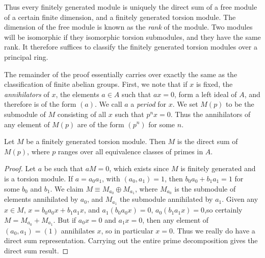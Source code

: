 Thus every finitely generated module is uniquely the direct sum of a free module of a certain finite dimension, and a finitely generated torsion module. The dimension of the free module is known as the \emph{rank} of the module. Two modules will be isomorphic if they isomorphic torsion submodules, and they have the same rank. It therefore suffices to classify the finitely generated torsion modules over a principal ring.

The remainder of the proof essentially carries over exactly the same as the classification of finite abelian groups. First, we note that if $x$ is fixed, the \emph{annihilators} of $x$, the elements $a \in A$ such that $ax = 0$, form a left ideal of $A$, and therefore is of the form $(a)$. We call $a$ a \emph{period} for $x$. We set $M(p)$ to be the submodule of $M$ consisting of all $x$ such that $p^n x = 0$. Thus the annihilators of any element of $M(p)$ are of the form $(p^n)$ for some $n$.

\begin{theorem}
    Let $M$ be a finitely generated torsion module. Then $M$ is the direct sum of $M(p)$, where $p$ ranges over all equivalence classes of primes in $A$.
\end{theorem}
\begin{proof}
    Let $a$ be such that $aM = 0$, which exists since $M$ is finitely generated and is a torsion module. If $a = a_0a_1$, with $(a_0,a_1) = 1$, then $b_0a_0 + b_1a_1 = 1$ for some $b_0$ and $b_1$. We claim $M \equiv M_{a_0} \oplus M_{a_1}$, where $M_{a_0}$ is the submodule of elements annihilated by $a_0$, and $M_{a_1}$ the submodule annihilated by $a_1$. Given any $x \in M$, $x = b_0a_0x + b_1a_1x$, and $a_1(b_0a_0x) = 0$, $a_0(b_1a_1x) = 0$,so certainly $M = M_{a_0} + M_{a_1}$. But if $a_0 x = 0$ and $a_1 x = 0$, then any element of $(a_0,a_1) = (1)$ annihilates $x$, so in particular $x = 0$. Thus we really do have a direct sum representation. Carrying out the entire prime decomposition gives the direct sum result.
\end{proof}

